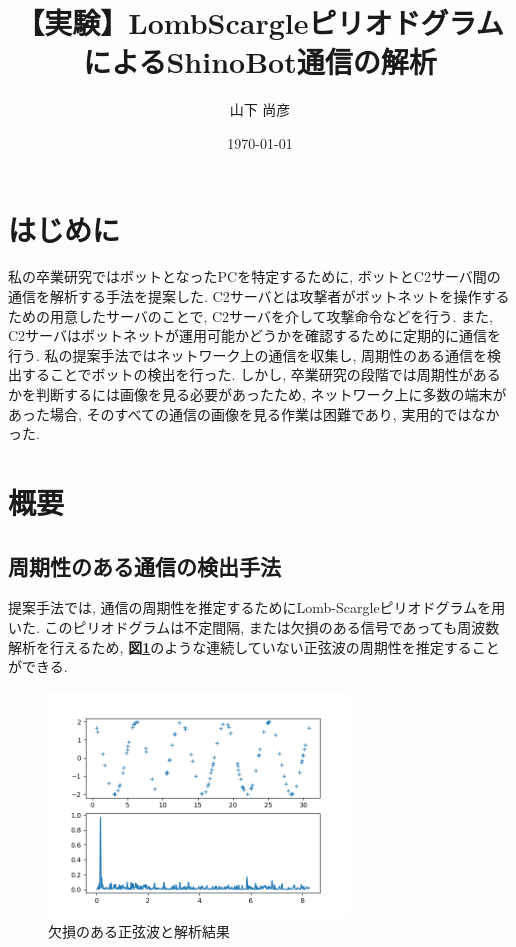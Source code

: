 \documentclass[twocolumn,10pt]{ltjsarticle}
\title{【実験】LombScargleピリオドグラムによるShinoBot通信の解析}
\author{山下 尚彦}
\date{\today}
\begin{document}
\maketitle

\section{はじめに}
私の卒業研究ではボットとなったPCを特定するために, ボットとC2サーバ間の通信を解析する手法を提案した. 
C2サーバとは攻撃者がボットネットを操作するための用意したサーバのことで, C2サーバを介して攻撃命令などを行う. 
また, C2サーバはボットネットが運用可能かどうかを確認するために定期的に通信を行う. 
私の提案手法ではネットワーク上の通信を収集し, 周期性のある通信を検出することでボットの検出を行った. 
しかし, 卒業研究の段階では周期性があるかを判断するには画像を見る必要があったため, 
ネットワーク上に多数の端末があった場合, そのすべての通信の画像を見る作業は困難であり, 実用的ではなかった. 

\section{概要}
\subsection{周期性のある通信の検出手法}
提案手法では, 通信の周期性を推定するためにLomb-Scargleピリオドグラム\cite{vanderplas2018understanding}を用いた. 
このピリオドグラムは不定間隔, または欠損のある信号であっても周波数解析を行えるため, 
\textbf{図\ref{fig:lombscargle}}のような連続していない正弦波の周期性を推定することができる. 

\begin{figure}[htb]
    \centering
    \includegraphics[width=8cm]{images/【実験】LombScargleピリオドグラムによるShinoBot通信の解析/lombscargle.png}
    \caption{欠損のある正弦波と解析結果}
    \label{fig:lombscargle}
\end{figure}
\end{document}
